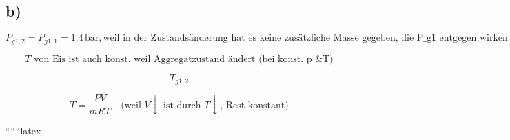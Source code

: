 

\subsection*{b)}

\[
P_{g1,2} = P_{g1,1} = 1.4 \, \text{bar}, \text{weil in der Zustandsänderung hat es keine zusätzliche Masse gegeben, die P_{g1} entgegen wirken muss (da EW konstante Masse \& Volumen auch)}
\]

\[
T \text{ von Eis ist auch konst. weil Aggregatzustand ändert (bei konst. p \& T)}
\]

\[
T_{g1,2}
\]

\[
T = \frac{PV}{mRT} \quad \text{(weil } V \downarrow \text{ ist durch } T \downarrow \text{, Rest konstant)}
\]

``````latex